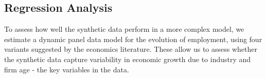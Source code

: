 


\subsection{Regression Analysis}

To assess how well the synthetic data perform in a more complex model, we estimate a dynamic panel data model for the evolution of employment, using four variants suggested by the economics literature. 
These allow us to assess whether the synthetic data capture variability in economic growth due to industry and firm age - the key variables in the data. 

